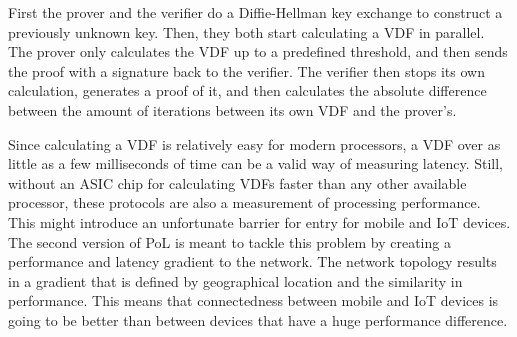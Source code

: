 First the prover and the verifier do a Diffie-Hellman key exchange to construct a previously unknown key. Then, they both start calculating a VDF in parallel. The prover only calculates the VDF up to a predefined threshold, and then sends the proof with a signature back to the verifier. The verifier then stops its own calculation, generates a proof of it, and then calculates the absolute difference between the amount of iterations between its own VDF and the prover's.

Since calculating a VDF is relatively easy for modern processors, a VDF over as little as a few milliseconds of time can be a valid way of measuring latency. Still, without an ASIC chip for calculating VDFs faster than any other available processor, these protocols are also a measurement of processing performance. This might introduce an unfortunate barrier for entry for mobile and IoT devices. The second version of PoL is meant to tackle this problem by creating a performance and latency gradient to the network. The network topology results in a gradient that is defined by geographical location and the similarity in performance. This means that connectedness between mobile and IoT devices is going to be better than between devices that have a huge performance difference.

